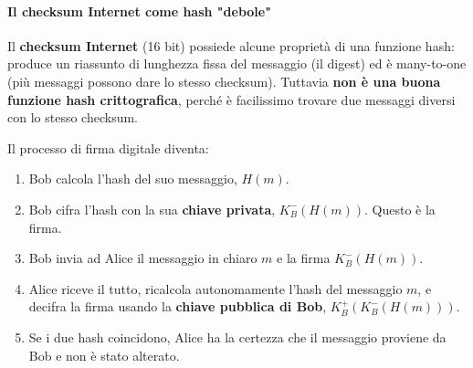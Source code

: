 \paragraph{Il checksum Internet come hash "debole"}
Il \textbf{checksum Internet} (16 bit) possiede alcune proprietà di una funzione hash: produce un riassunto di lunghezza fissa del messaggio (il digest) ed è many-to-one (più messaggi possono dare lo stesso checksum). Tuttavia \textbf{non è una buona funzione hash crittografica}, perché è facilissimo trovare due messaggi diversi con lo stesso checksum.


Il processo di firma digitale diventa:
\begin{enumerate}
    \item Bob calcola l'hash del suo messaggio, $H(m)$.
    \item Bob cifra l'hash con la sua \textbf{chiave privata}, $K_B^-(H(m))$. Questo è la firma.
    \item Bob invia ad Alice il messaggio in chiaro $m$ e la firma $K_B^-(H(m))$.
    \item Alice riceve il tutto, ricalcola autonomamente l'hash del messaggio $m$, e decifra la firma usando la \textbf{chiave pubblica di Bob}, $K_B^+(K_B^-(H(m)))$.
    \item Se i due hash coincidono, Alice ha la certezza che il messaggio proviene da Bob e non è stato alterato.
\end{enumerate}

